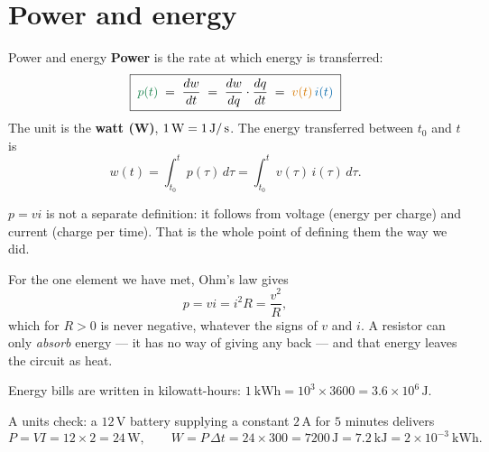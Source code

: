 \documentclass[11pt,a4paper]{article}
\newcommand{\Icol}[1]{\textcolor{ccur}{#1}}
\newcommand{\Vcol}[1]{\textcolor{cvolt}{#1}}
\newcommand{\Pcol}[1]{\textcolor{cpow}{#1}}
\newcommand{\uni}[1]{\,\mathrm{#1}}
\newcommand{\A}{\uni{A}}   \newcommand{\V}{\uni{V}}
\newcommand{\W}{\uni{W}}   \newcommand{\J}{\uni{J}}
\begin{document}
\section{Power and energy}

\begin{definitionbox}{Power and energy}
\textbf{Power} is the rate at which energy is transferred:
\[
  \boxed{\;\Pcol{p(t)} \;=\; \frac{dw}{dt}
        \;=\; \frac{dw}{dq}\cdot\frac{dq}{dt}
        \;=\; \Vcol{v(t)}\,\Icol{i(t)}\;}
\]
The unit is the \textbf{watt (W)}, $1\W = 1\J/\s$. The energy transferred between $t_0$
and $t$ is
\[
  w(t) = \int_{t_0}^{t} p(\tau)\,d\tau = \int_{t_0}^{t} v(\tau)\,i(\tau)\,d\tau .
\]
\end{definitionbox}

$p = vi$ is not a separate definition: it follows from voltage (energy per charge) and
current (charge per time). That is the whole point of defining them the way we did.

For the one element we have met, Ohm's law gives
\[
  p = vi = i^2 R = \frac{v^2}{R} ,
\]
which for $R > 0$ is never negative, whatever the signs of $v$ and $i$. A resistor can
only \emph{absorb} energy --- it has no way of giving any back --- and that energy leaves
the circuit as heat.

Energy bills are written in kilowatt-hours: $1\ \mathrm{kWh} = 10^3 \times 3600 =
3.6\times10^6\J$.

A units check: a $12\V$ battery supplying a constant $2\A$ for $5$ minutes delivers
\[
  P = VI = 12 \times 2 = 24\W,
  \qquad
  W = P\,\Delta t = 24 \times 300 = 7200\J = 7.2\ \mathrm{kJ}
  = 2\times10^{-3}\ \mathrm{kWh}.
\]
\end{document}
